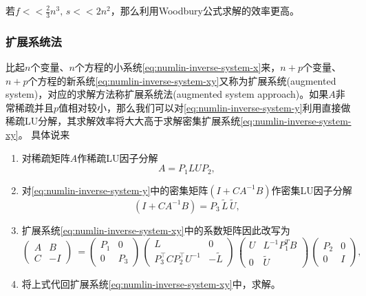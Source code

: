 \begin{subappendices}
\begin{enumerate}
  若$f << \frac{2}{3} n^{3}, \, s << 2 n ^{2}$，那么利用Woodbury公式求解的效率更高。
\end{enumerate}

\subsubsection{扩展系统法}
\label{sec:numlin-inverse-augmented-system}
比起$n$个变量、$n$个方程的小系统\eqref{eq:numlin-inverse-system-x}来，$n+p$个变量、$n+p$个方程的新系统\eqref{eq:numlin-inverse-system-xy}又称为扩展系统(augmented system)，对应的求解方法称扩展系统法(augmented system approach)。如果$A$非常稀疏并且$p$值相对较小，那么我们可以对\eqref{eq:numlin-inverse-system-y}利用直接做稀疏LU分解，其求解效率将大大高于求解密集扩展系统\eqref{eq:numlin-inverse-system-xy}。
具体说来
\begin{enumerate}
\item 对稀疏矩阵$A$作稀疏LU因子分解
\begin{equation}
  \label{eq:numlin-augmented-sparse-lu-factorization}
  A=P_{1} L U P_{2},
\end{equation}
\item 对\eqref{eq:numlin-inverse-system-y}中的密集矩阵$\left( I + C A^{-1} B \right)$作密集LU因子分解
\begin{equation*}
  \left( I + C A^{-1} B \right)
  = P_{3} \, \widetilde{L} \, \widetilde{U},
\end{equation*}
\item 扩展系统\eqref{eq:numlin-inverse-system-xy}中的系数矩阵因此改写为
\begin{equation}
  \label{eq:numlin-inverse-system-augmented-approach}
  \begin{pmatrix}
    A & B \\
    C & -I
  \end{pmatrix}\
  =
  \begin{pmatrix}
    P_{1} & 0 \\
    0 & P_{3}
  \end{pmatrix}
  \,
  \begin{pmatrix}
    L & 0 \\
    P_{3}^{\top} C P_{2}^{\top} U^{-1} & - \widetilde{L}
  \end{pmatrix}
  \,
  \begin{pmatrix}
    U & L^{-1} P_{1}^{T} B \\
    0 & \widetilde{U}
  \end{pmatrix}
  \,
  \begin{pmatrix}
    P_{2} & 0 \\
    0 & I
  \end{pmatrix},
\end{equation}
  \item 将上式代回扩展系统\eqref{eq:numlin-inverse-system-xy}中，求解。
\end{enumerate}


\end{subappendices}
